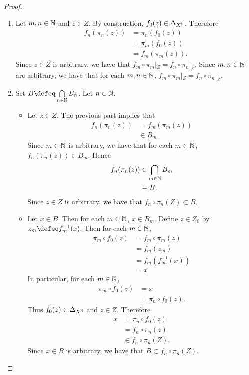 \documentclass{book}
\begin{document}
	\begin{proof}\
		\begin{enumerate}
			\item Let $m,n \in \mathbb{N}$ and $z \in Z$. By construction, $f_0(z) \in \Delta_{X^{\mathbb{N}}}$. Therefore
			\begin{align*}
				f_n (\pi_n(z)) 
				& = \pi_n (f_0(z)) \\
				& = \pi_m (f_0(z)) \\
				& = f_m (\pi_m(z)).
			\end{align*}
			Since $z \in Z$ is arbitrary, we have that $f_m \circ \pi_m|_Z = f_n \circ \pi_n|_Z$. Since $m,n\in \mathbb{N}$ are arbitrary, we have that for each $m,n \in \mathbb{N}$, $f_m \circ \pi_m|_Z = f_n \circ \pi_n|_Z$.
			\item Set $B \defeq \bigcap\limits_{n \in \N} B_n$. Let $n \in \mathbb{N}$. 
			\begin{itemize}
				\item Let $z \in Z$. The previous part implies that   
				\begin{align*}
					f_n (\pi_n(z)) 
					& = f_m (\pi_m(z)) \\
					& \in B_m.
				\end{align*}
				Since $m \in \mathbb{N}$ is arbitrary, we have that for each $m \in \mathbb{N}$, $f_n (\pi_n(z)) \in B_m$. Hence 
				\begin{align*}
					f_n (\pi_n(z)) 
					& \in \bigcap_{m \in \mathbb{N}} B_m \\
					& = B.
				\end{align*} 
				Since $z \in Z$ is arbitrary, we have that $f_n \circ \pi_n(Z) \subset B$.
				\item Let $x \in B$. Then for each $m \in \mathbb{N}$, $x \in B_m$. Define $z \in Z_0$ by $z_m \defeq f_m^{-1}(x)$. Then for each $m \in \mathbb{N}$, 
				\begin{align*}
					\pi_m \circ f_0(z) 
					& = f_m \circ \pi_m (z) \\
					& = f_m(z_m) \\
					& = f_m(f_m^{-1}(x)) \\
					& = x 
				\end{align*}
				In particular, for each $m \in \mathbb{N}$, 
				\begin{align*}
					\pi_m \circ f_0(z) 
					& = x \\
					& = \pi_n \circ f_0(z). 
				\end{align*}
				Thus $f_0(z) \in \Delta_{X^{\mathbb{N}}}$ and $z \in Z$. Therefore 
				\begin{align*}
					x 
					& = \pi_n \circ f_0(z) \\
					& = f_n \circ \pi_n(z) \\
					& \in f_n \circ \pi_n (Z).  
				\end{align*}  
				Since $x \in B$ is arbitrary, we have that $B \subset f_n \circ \pi_n (Z)$.  
			\end{itemize}
		\end{enumerate}
	\end{proof}
	
\end{document}
